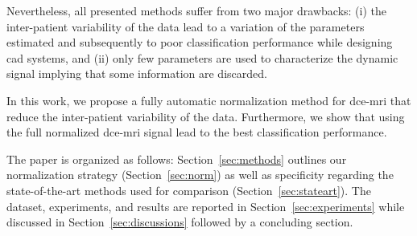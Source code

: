 Nevertheless, all presented methods suffer from two major drawbacks:
(i) the inter-patient variability of the data lead to a variation of the parameters estimated and subsequently to poor classification performance while designing \ac{cad} systems, and
(ii) only few parameters are used to characterize the dynamic signal implying that some information are discarded.

In this work, we propose a fully automatic normalization method for \ac{dce}-\ac{mri} that reduce the inter-patient variability of the data.
Furthermore, we show that using the full normalized \ac{dce}-\ac{mri} signal lead to the best classification performance.

The paper is organized as follows: Section~\ref{sec:methods} outlines our normalization strategy (Section~\ref{sec:norm}) as well as specificity regarding the state-of-the-art methods used for comparison (Section~\ref{sec:stateart}). The dataset, experiments, and results are reported in Section~\ref{sec:experiments} while discussed in Section~\ref{sec:discussions} followed by a concluding section.

